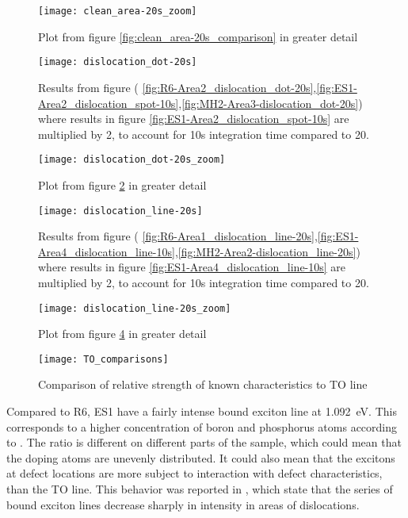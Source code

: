 \begin{figure}[H]
\centering
\texttt{[image: clean\_area-20s\_zoom]}
\caption[Comparisons in a clean area]{Plot from figure \ref{fig:clean_area-20s_comparison} in greater detail}
\label{fig:clean_area-20s_zoom_comparison}%
\end{figure}

\begin{figure}[H]
\centering
\texttt{[image: dislocation\_dot-20s]}
\caption[Comparisons in a dislocation dot]{Results from figure ( \ref{fig:R6-Area2_dislocation_dot-20s},\ref{fig:ES1-Area2_dislocation_spot-10s},\ref{fig:MH2-Area3-dislocation_dot-20s}) where results in figure \ref{fig:ES1-Area2_dislocation_spot-10s} are multiplied by 2, to account for 10s integration time compared to 20. }
\label{fig:dislocation_dot-20s_comparison}%
\end{figure}

\begin{figure}[H]
\centering
\texttt{[image: dislocation\_dot-20s\_zoom]}
\caption[Comparisons in a dislocation dot]{Plot from figure \ref{fig:dislocation_dot-20s_comparison} in greater detail}
\label{fig:dislocation_dot-20s_zoom_comparison}%
\end{figure}

\begin{figure}[H]
\centering
\texttt{[image: dislocation\_line-20s]}
\caption[Comparisons in a dislocation line]{Results from figure ( \ref{fig:R6-Area1_dislocation_line-20s},\ref{fig:ES1-Area4_dislocation_line-10s},\ref{fig:MH2-Area2-dislocation_line-20s}) where results in figure \ref{fig:ES1-Area4_dislocation_line-10s} are multiplied by 2, to account for 10s integration time compared to 20. }
\label{fig:dislocation_line-20s_comparison}%
\end{figure}


\begin{figure}[H]
\centering
\texttt{[image: dislocation\_line-20s\_zoom]}
\caption[Comparisons in a dislocation line]{Plot from figure \ref{fig:dislocation_line-20s_comparison} in greater detail}
\label{fig:dislocation_line-20s_zoom_comparison}%
\end{figure}

\begin{figure}[H]
\centering
\texttt{[image: TO\_comparisons]}
\caption[Comparison or relative strength]{Comparison of relative strength of known characteristics to TO line}
\label{fig:TO_comparisons}%
\end{figure}




Compared to R6, ES1 have a fairly intense bound exciton line at 1.092~eV. This corresponds to a higher concentration of boron and phosphorus atoms according to \cite{tajima78}. The ratio is different on different parts of the sample, which could mean that the doping atoms are unevenly distributed. It could also mean that the excitons at defect locations are more subject to interaction with defect characteristics, than the TO line. This behavior was reported in \cite{drozdov76}, which state that the series of bound exciton lines decrease sharply in intensity in areas of dislocations.